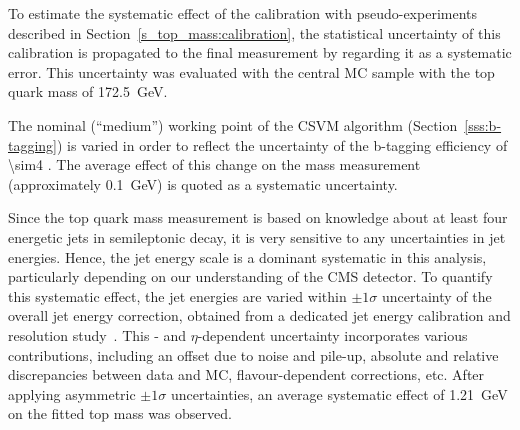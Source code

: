 

\begin{description}[wide=\parindent]
\item [Fit calibration statistics.] To estimate the systematic effect of the calibration with pseudo-experiments
described in Section~\ref{s_top_mass:calibration}, the statistical uncertainty of this calibration is propagated to the
final measurement by regarding it as a systematic error. This uncertainty was evaluated with the central \ttbar MC
sample with the top quark mass of \SI{172.5}{\GeV}.

\item [b-tagging.] The nominal (``medium'') working point of the CSVM algorithm (Section~\ref{sss:b-tagging}) is varied
in order to reflect the uncertainty of the b-tagging efficiency of \SI{\sim4}{\pc} \autocite{b-tagging_CMS}. The average
effect of this change on the mass measurement (approximately \SI{0.1}{\GeV}) is quoted as a systematic uncertainty.

\item [Jet energy scale.] Since the top quark mass measurement is based on knowledge about at least four energetic jets
in semileptonic \ttbar decay, it is very sensitive to any uncertainties in jet energies. Hence, the jet energy scale is
a dominant systematic in this analysis, particularly depending on our understanding of the CMS detector. To quantify
this systematic effect, the jet energies are varied within $\pm1\sigma$ uncertainty of the overall jet energy
correction, obtained from a dedicated jet energy calibration and resolution study~\autocite{JEC_7TeV}. This \pt- and
$\eta$-dependent uncertainty incorporates various contributions, including an offset due to noise and pile-up, absolute
and relative discrepancies between data and MC, flavour-dependent corrections, etc. After applying asymmetric
$\pm1\sigma$ uncertainties, an average systematic effect of \SI{1.21}{\GeV} on the fitted top mass was observed.



\end{description}
